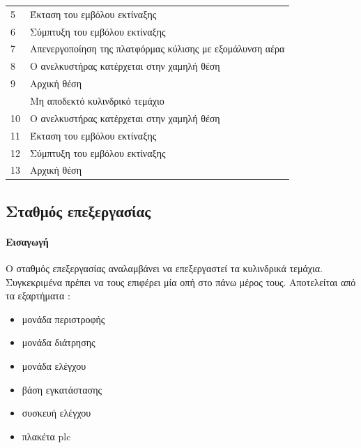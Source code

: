 \documentclass[a4paper,12pt,twoside]{report}
\begin{document}
{\begin{longtable} { m{0.5cm} m{12cm} }
					 5 & Έκταση του εμβόλου εκτίναξης\\
					 6 & Σύμπτυξη του εμβόλου εκτίναξης\\
					 7 & Απενεργοποίηση της πλατφόρμας κύλισης με εξομάλυνση αέρα\\
					 8 & Ο ανελκυστήρας κατέρχεται στην χαμηλή θέση\\
					 9 & Αρχική θέση\\
					  & Μη αποδεκτό κυλινδρικό τεμάχιο\\
					 10 & Ο ανελκυστήρας κατέρχεται στην χαμηλή θέση\\
					 11 & Έκταση του εμβόλου εκτίναξης\\
					 12 & Σύμπτυξη του εμβόλου εκτίναξης\\
					 13 & Αρχική θέση\\
					\hline
				\end{longtable}
				
				
			\FloatBarrier
			\subsection{Σταθμός επεξεργασίας \cite{FestoMPSProcessingStationManual} \cite{ΤοΦυσικόΣύστημαFestoMPS} \cite{UMLΕνσωματωμέναΣυστήματα}}
			
			\label{ενότ:Σταθμός επεξεργασίας}
				\paragraph{Εισαγωγή} {Ο σταθμός επεξεργασίας αναλαμβάνει να επεξεργαστεί τα κυλινδρικά τεμάχια. Συγκεκριμένα πρέπει να τους επιφέρει μία οπή στο πάνω μέρος τους. Αποτελείται από τα εξαρτήματα :
				}
				\begin{itemize}
					\item μονάδα περιστροφής
					\item μονάδα διάτρησης
					\item μονάδα ελέγχου
					\item βάση εγκατάστασης
					\item συσκευή ελέγχου
					\item πλακέτα plc
				\end{itemize}
}
\end{document}
